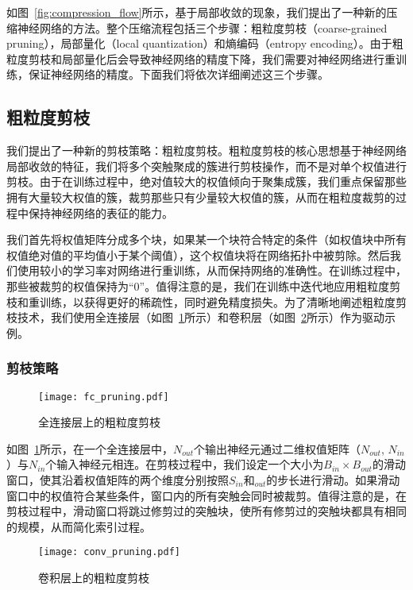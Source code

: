 如图~\ref{fig:compression_flow}所示，基于局部收敛的现象，我们提出了一种新的压缩神经网络的方法。整个压缩流程包括三个步骤：粗粒度剪枝（coarse-grained pruning），局部量化（local quantization）和熵编码（entropy encoding）。由于粗粒度剪枝和局部量化后会导致神经网络的精度下降，我们需要对神经网络进行重训练，保证神经网络的精度。下面我们将依次详细阐述这三个步骤。


\subsection{粗粒度剪枝}

我们提出了一种新的剪枝策略：粗粒度剪枝。粗粒度剪枝的核心思想基于神经网络局部收敛的特征，我们将多个突触聚成的簇进行剪枝操作，而不是对单个权值进行剪枝。由于在训练过程中，绝对值较大的权值倾向于聚集成簇，我们重点保留那些拥有大量较大权值的簇，裁剪那些只有少量较大权值的簇，从而在粗粒度裁剪的过程中保持神经网络的表征的能力。

我们首先将权值矩阵分成多个块，如果某一个块符合特定的条件（如权值块中所有权值绝对值的平均值小于某个阈值），这个权值块将在网络拓扑中被剪除。然后我们使用较小的学习率对网络进行重训练，从而保持网络的准确性。在训练过程中，那些被裁剪的权值保持为“0”。值得注意的是，我们在训练中迭代地应用粗粒度剪枝和重训练，以获得更好的稀疏性，同时避免精度损失。为了清晰地阐述粗粒度剪枝技术，我们使用全连接层（如图~\ref{fig:fc_pruning}所示）和卷积层（如图~\ref{fig:conv_pruning}所示）作为驱动示例。

\subsubsection{剪枝策略}

\begin{figure}[h]
\centering
\texttt{[image: fc\_pruning.pdf]}
\caption{全连接层上的粗粒度剪枝}
\label{fig:fc_pruning}
\end{figure}

如图~\ref{fig:fc_pruning}所示，在一个全连接层中，$N_{out}$个输出神经元通过二维权值矩阵（$N_{out}$, $N_{in}$）与$N_{in}$个输入神经元相连。在剪枝过程中，我们设定一个大小为$B_{in} \times B_{out}$的滑动窗口，使其沿着权值矩阵的两个维度分别按照$S_{in}$和$_{out}$的步长进行滑动。如果滑动窗口中的权值符合某些条件，窗口内的所有突触会同时被裁剪。值得注意的是，在剪枝过程中，滑动窗口将跳过修剪过的突触块，使所有修剪过的突触块都具有相同的规模，从而简化索引过程。

\begin{figure}[h]
  \centering
  \texttt{[image: conv\_pruning.pdf]}
  \caption{卷积层上的粗粒度剪枝}
  \label{fig:conv_pruning}
\end{figure}

